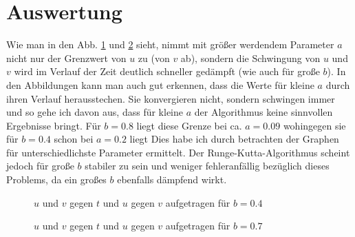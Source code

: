 \documentclass[12pt,a4paper,titlepage,headinclude,bibtotoc]{scrartcl}
\begin{document}
\section{Auswertung}
\label{sec:auswertung}
Wie man in den Abb. \ref{fig:b04} und \ref{fig:b07} sieht, nimmt mit größer werdendem Parameter $a$ nicht nur der Grenzwert von $u$ zu (von $v$ ab), sondern die Schwingung von $u$ und $v$ wird im Verlauf der Zeit deutlich schneller gedämpft (wie auch für große $b$).
In den Abbildungen kann man auch gut erkennen, dass die Werte für kleine $a$ durch ihren Verlauf herausstechen.
Sie konvergieren nicht, sondern schwingen immer und so gehe ich davon aus, dass für kleine $a$ der Algorithmus keine sinnvollen Ergebnisse bringt.
Für $b=0.8$ liegt diese Grenze bei ca. $a=0.09$ wohingegen sie für $b=0.4$ schon bei $a=0.2$ liegt
Dies habe ich durch betrachten der Graphen für unterschiedlichste Parameter ermittelt.
Der Runge-Kutta-Algorithmus scheint jedoch für große $b$ stabiler zu sein und weniger fehleranfällig bezüglich dieses Problems, da ein großes $b$ ebenfalls dämpfend wirkt.

\begin{figure}[h]
   \centering
   \hfill
   \hfill
   \caption{$u$ und $v$ gegen $t$ und $u$ gegen $v$ aufgetragen für $b=0.4$}
   \label{fig:b04}
 \end{figure}
 \begin{figure}[h]
   \centering
   \hfill
   \hfill
   \caption{$u$ und $v$ gegen $t$ und $u$ gegen $v$ aufgetragen für $b=0.7$}
   \label{fig:b07}
 \end{figure}
\end{document}
